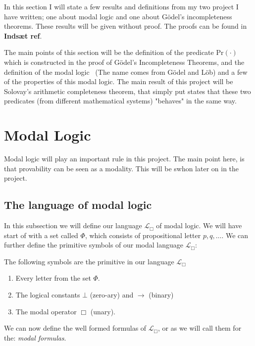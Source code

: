 \documentclass[../main.tex]{subfiles}
\begin{document}
In this section I will state a few results and definitions from my two project
I have written; one about modal logic and one about Gödel's incompleteness
theorems.
These results will be given without proof. The proofs can be found in
\textbf{Indsæt ref}.

The main points of this section will be the definition of the predicate
$\text{Pr}(\cdot)$ which is constructed in the proof of  Gödel's Incompleteness
Theorems, and the definition of the modal logic \GL\
(The name comes from Gödel and Löb) and a few of the properties of this modal
logic. The
main result of this project will be Solovay's arithmetic completeness theorem,
that simply put states that these two predicates (from different mathematical
systems) "behaves" in the
same way.

\section{Modal Logic}
Modal logic will play an important rule in this project. The main point here,
is that provability can be seen as a modality. This will be swhon later on in
the project.

\subsection{The language of modal logic}
In this subsection we will define our language $\mathcal{L}_\Box$ of modal logic. 
We will have start of with a  set called $\Phi$, which consists of propositional letter
$p,q,\ldots$. We can further define the primitive symbols of our modal language
$\mathcal{L}_\Box$:

\begin{defi}
	The following symbols are the primitive in our language
	$\mathcal{L}_\Box$
	\begin{enumerate}
		\item Every letter from the set $\Phi$.
		\item The logical constants $\bot$ (zero-ary) and $\rightarrow$
			(binary)
		\item The modal operator $\Box$ (unary).
	\end{enumerate}
\end{defi}
We can now define the well formed formulas of $\mathcal{L}_\Box$, or as we will
call them for the: \textit{modal formulas}.
\end{document}
